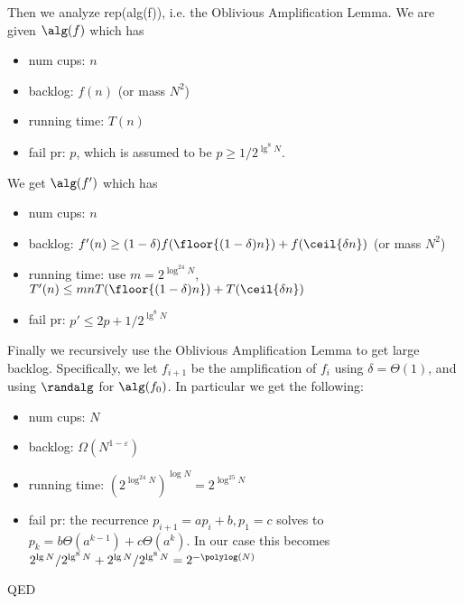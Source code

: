 Then we analyze rep(alg(f)), i.e. the Oblivious Amplification Lemma.
We are given $\alg(f)$ which has
\begin{itemize}
  \item num cups: $n$
  \item backlog: $f(n)$ (or mass $N^2$)
  \item running time: $T(n)$
  \item fail pr: $p$, which is assumed to be $p\ge 1/2^{\lg^8 N}$.
\end{itemize}
We get $\alg(f')$ which has
\begin{itemize}
  \item num cups: $n$
  \item backlog: $f'(n) \ge (1-\delta)f(\floor{(1-\delta)n}) + f(\ceil{\delta n})$ (or mass $N^2$)
  \item running time: use $m = 2^{\log^{24} N}$, $T'(n) \le mnT(\floor{(1-\delta)n}) + T(\ceil{\delta n})$
  \item fail pr: $p' \le 2p + 1/2^{\lg^8 N}$
\end{itemize}

Finally we recursively use the Oblivious Amplification Lemma to get large backlog.
Specifically, we let $f_{i+1}$ be the amplification of $f_i$
using $\delta = \Theta(1)$, and using $\randalg$ for $\alg(f_0)$.
In particular we get the following:
\begin{itemize}
  \item num cups: $N$ 
  \item backlog: $\Omega(N^{1-\varepsilon})$
  \item running time: $(2^{\log^{24} N})^{\log N} = 2^{\log^{25} N}$
  \item fail pr: the recurrence $p_{i+1} = ap_i + b, p_1 = c$
    solves to $p_k = b\Theta(a^{k-1}) + c \Theta(a^k)$. In our
    case this becomes $2^{\lg N} / 2^{\lg^8 N} + 2^{\lg
    N}/2^{\lg^8 N} = 2^{-\polylog(N)}$
\end{itemize}

QED

